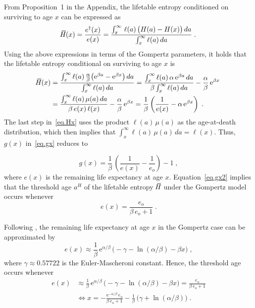 \documentclass[a4paper,twoside, openright, 12pt, leqno]{article}
\newcommand*\xbar[1]{%
   \hbox{%
     \vbox{%
       \hrule height 0.5pt %
       \kern0.3ex%
       \hbox{%
         \kern-0.28em%
         \ensuremath{#1}%
         \kern-0.05em%
       }%
     }%
   }%
}
\begin{document}
From Proposition~1 in the Appendix, the lifetable entropy conditioned on surviving to age $x$ can be expressed as
$$
\xbar{H}(x)=\frac{e^\dagger(x)}{e(x)}=\frac{\int_x^\infty\,\ell(a)\,\big(H(a)-H(x)\big)\,da}{\int_x^\infty\ell(a)\,da}\;.
$$
Using the above expressions in terms of the Gompertz parameters, it holds that the lifetable entropy conditional on surviving to age $x$ is
%
\begin{equation}
  \begin{split}
	\xbar{H}(x)
        & = \frac{\int_x^\infty \ell(a)\,\frac{\alpha}{\beta}\big(\mathrm{e}^{\beta a}-\mathrm{e}^{\beta x}\big)\,da}{\int_x^\infty\ell(a)\,da}=\frac{\int_x^\infty \ell(a)\,\alpha\,\mathrm{e}^{\beta a}\,da}{\beta\int_x^\infty\ell(a)\,da} - \frac{\alpha}{\beta}\,\mathrm{e}^{\beta x} 				\\
        & = \frac{\int_x^\infty\ell(a)\,\mu(a)\,da}{\beta\,e(x)\,\ell(x)} - \frac{\alpha}{\beta}\,\mathrm{e}^{\beta x}=\frac{1}{\beta}\left(\frac{1}{e(x)}-\alpha\,\mathrm{e}^{\beta x}\right)\;.
  \end{split}
  \label{eq.Hx}
\end{equation}
%
The last step in~\eqref{eq.Hx} uses the product $\ell(a)\,\mu(a)$ as the age-at-death distribution, which then implies that $\int_x^\infty \ell(a)\,\mu(a)\,da=\ell(x)$. Thus, $g(x)$ in~\eqref{eq.gx} reduces to

\begin{equation}
g(x) = \frac{1}{\beta}\,\left(\frac{1}{e(x)}-\frac{1}{e_o}\right)-1\;,
\label{eq.gx2}
\end{equation}
%
where $e(x)$ is the remaining life expectancy at age $x$. Equation~\eqref{eq.gx2} implies that the threshold age $a^H$ of the lifetable entropy $\,\xbar{H}$ under the Gompertz model occurs whenever
\begin{equation}
e(x) = \frac{e_o}{\beta\,e_o+1}\;.
\label{eq.threshold}
\end{equation}

Following \citet{missov2013gompertz}, the remaining life expectancy at age $x$ in the Gompertz case can be approximated by
%
\begin{equation}
  e(x)\approx\frac{1}{\beta}\,\mathrm{e}^{\alpha/\beta}\,\big(-\gamma-\ln(\alpha/\beta)-\beta x\big)\;,
  \label{eq:exapprox}
\end{equation}
%
where $\gamma\approx 0.57722$ is the Euler-Mascheroni constant. Hence, the threshold age occurs whenever
%
\begin{equation*}
\begin{split}
e(x)	& \approx\frac{1}{\beta}\,\mathrm{e}^{\alpha/\beta}\,\big(-\gamma-\ln(\alpha/\beta)-\beta x\big)=\frac{e_o}{\beta\,e_o+1}			\\
& \Longleftrightarrow x=-\frac{\mathrm{e}^{-\alpha/\beta}\,e_o}{\beta\,e_o+1}-\frac{1}{\beta}\,\big(\gamma+\ln(\alpha/\beta)\big)\;.
\end{split}
\end{equation*}
\end{document}
